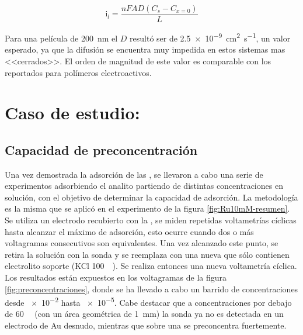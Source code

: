 			\begin{equation}
					\text{i}_l = \frac{nFAD(C_{s}-C_{x=0})}{L}
					\label{eq:de-ferroceno-bajaT}
			\end{equation}
			  	

		Para una película de \SI{200}{nm} el $D$ resultó ser de \SI{2.5e-9}{\square\cm\per\second}, un valor esperado, ya que la difusión se encuentra muy impedida en estos sistemas mas <<cerrados>>. El orden de magnitud de este valor es comparable con los reportados para polímeros electroactivos.\cite{Kolb1993}
			
\section{Caso de estudio: \texorpdfstring{\aminorutenioCompleto}{Ru(NH3)CL3}}
	
	\subsection{Capacidad de preconcentración}

		Una vez demostrada la adsorción \ru\space de las \pdm, se llevaron a cabo una serie de experimentos adsorbiendo el analito partiendo de distintas concentraciones en solución, con el objetivo de determinar la capacidad de adsorción. La metodología es la misma que se aplicó en el experimento de la figura \ref{fig:Ru10mM-resumen}. Se utiliza un electrodo recubierto con la \pdmF\space, se miden repetidas voltametrías cíclicas hasta alcanzar el máximo de adsorción, esto ocurre cuando dos o más voltagramas consecutivos son equivalentes. Una vez alcanzado este punto, se retira la solución con la sonda y se reemplaza con una nueva que sólo contienen electrolito soporte (KCl \SI{100}{\milli\Molar}). Se realiza entonces una nueva voltametría cíclica. Los resultados están expuestos en los voltagramas de la figura \ref{fig:preconcentraciones}, donde se ha llevado a cabo un barrido de concentraciones desde \SI{e-2}{\Molar} hasta \SI{e-5}{\Molar}. Cabe destacar que a concentraciones por debajo de \SI{60}{\micro\Molar} (con un área geométrica de \SI{1}{mm}) la sonda ya no es detectada en un electrodo de Au desnudo, mientras que sobre una \pdm\space se preconcentra fuertemente.


